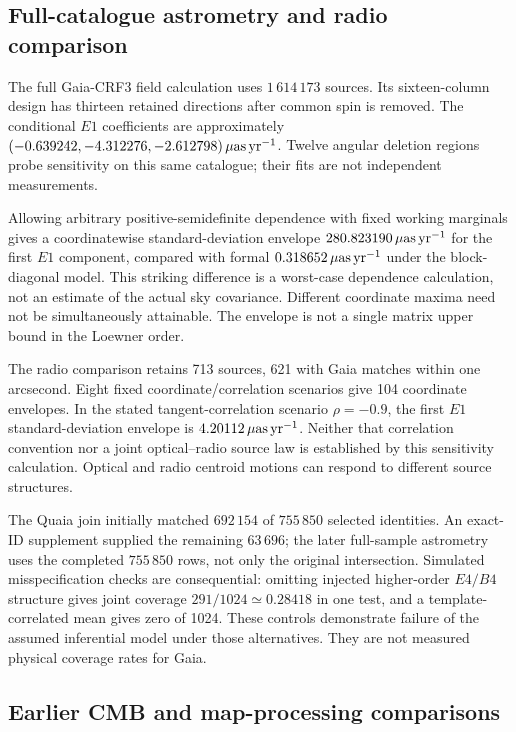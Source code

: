 \subsection{Full-catalogue astrometry and radio comparison}

The full Gaia-CRF3 field calculation uses $1\,614\,173$ sources. Its sixteen-column design has thirteen retained directions after common spin is removed. The conditional $E1$ coefficients are approximately $(-0.639242,-4.312276,-2.612798)\,\mu\mathrm{as}\,\mathrm{yr}^{-1}$. Twelve angular deletion regions probe sensitivity on this same catalogue; their fits are not independent measurements.

Allowing arbitrary positive-semidefinite dependence with fixed working marginals gives a coordinatewise standard-deviation envelope $280.823190\,\mu\mathrm{as}\,\mathrm{yr}^{-1}$ for the first $E1$ component, compared with formal $0.318652\,\mu\mathrm{as}\,\mathrm{yr}^{-1}$ under the block-diagonal model. This striking difference is a worst-case dependence calculation, not an estimate of the actual sky covariance. Different coordinate maxima need not be simultaneously attainable. The envelope is not a single matrix upper bound in the Loewner order.

The radio comparison retains 713 sources, 621 with Gaia matches within one arcsecond. Eight fixed coordinate/correlation scenarios give 104 coordinate envelopes. In the stated tangent-correlation scenario $\rho=-0.9$, the first $E1$ standard-deviation envelope is $4.20112\,\mu\mathrm{as}\,\mathrm{yr}^{-1}$. Neither that correlation convention nor a joint optical--radio source law is established by this sensitivity calculation. Optical and radio centroid motions can respond to different source structures.

The Quaia join initially matched $692\,154$ of $755\,850$ selected identities. An exact-ID supplement supplied the remaining $63\,696$; the later full-sample astrometry uses the completed $755\,850$ rows, not only the original intersection. Simulated misspecification checks are consequential: omitting injected higher-order $E4/B4$ structure gives joint coverage $291/1024\simeq0.28418$ in one test, and a template-correlated mean gives zero of 1024. These controls demonstrate failure of the assumed inferential model under those alternatives. They are not measured physical coverage rates for Gaia.

\subsection{Earlier CMB and map-processing comparisons}

